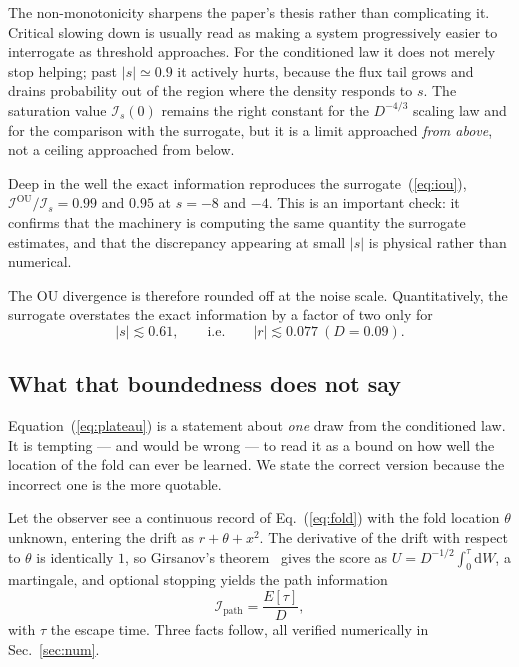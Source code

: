 \documentclass[%
 twocolumn,
 superscriptaddress,
 amsmath,amssymb,
 aps,
 pre,
 floatfix,
]{revtex4-2}
\newcommand{\dd}{\mathrm{d}}
\newcommand{\Ifish}{\mathcal{I}}
\begin{document}
The non-monotonicity sharpens the paper's thesis rather than complicating it.  Critical slowing down is usually read as making a system progressively easier to interrogate as threshold approaches.  For the conditioned law it does not merely stop helping; past $|s|\simeq0.9$ it actively hurts, because the flux tail grows and drains probability out of the region where the density responds to $s$.  The saturation value $\Ifish_s(0)$ remains the right constant for the $D^{-4/3}$ scaling law and for the comparison with the surrogate, but it is a limit approached \emph{from above}, not a ceiling approached from below.

Deep in the well the exact information reproduces the surrogate~(\ref{eq:iou}), $\Ifish^{\mathrm{OU}}/\Ifish_s=0.99$ and $0.95$ at $s=-8$ and $-4$.  This is an important check: it confirms that the machinery is computing the same quantity the surrogate estimates, and that the discrepancy appearing at small $|s|$ is physical rather than numerical.

The OU divergence is therefore rounded off at the noise scale.  Quantitatively, the surrogate overstates the exact information by a factor of two only for
\begin{equation}
\label{eq:s2x}
|s|\lesssim0.61,\qquad\text{i.e.}\qquad |r|\lesssim0.077\ (D=0.09).
\end{equation}

\subsection{\label{sec:pathinfo}What that boundedness does not say}

Equation~(\ref{eq:plateau}) is a statement about \emph{one} draw from the conditioned law.  It is tempting --- and would be wrong --- to read it as a bound on how well the location of the fold can ever be learned.  We state the correct version because the incorrect one is the more quotable.

Let the observer see a continuous record of Eq.~(\ref{eq:fold}) with the fold location $\theta$ unknown, entering the drift as $r+\theta+x^2$.  The derivative of the drift with respect to $\theta$ is identically $1$, so Girsanov's theorem~\cite{LiptserShiryaev2001} gives the score as $U=D^{-1/2}\!\int_0^{\tau}\dd W$, a martingale, and optional stopping yields the path information
\begin{equation}
\label{eq:ipath}
\Ifish_{\mathrm{path}}=\frac{E[\tau]}{D},
\end{equation}
with $\tau$ the escape time.  Three facts follow, all verified numerically in Sec.~\ref{sec:num}.
\end{document}
